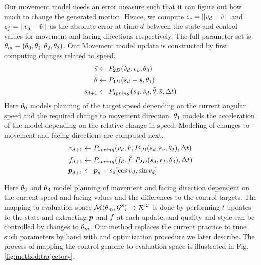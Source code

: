 Our movement model needs an error measure such that it can figure out how much to change the generated motion. Hence, we compute $\epsilon_v=||v_d-\hat{v}||$ and $\epsilon_f=||v_d-\hat{v}||$ as the absolute error at time $d$ between the state and control values for movement and facing directions respectively. 
%
The full parameter set is $\theta_{m}\equiv(\theta_0,\theta_1,\theta_2,\theta_3)$. 
%
Our Movement model update is constructed by first computing  changes related to speed. 
\begin{subequations}
\begin{align}
    \bar{s}&\leftarrow{}P_{2D}({\dot{v}}_d,\epsilon_v,\theta_0)\\
    \bar{\theta}&\leftarrow{}P_{1D}(s_d-\bar{s}, \theta_1)\\
    s_{d+1}&\leftarrow{}P_{spring}(s_d,\dot{s}_d,\bar{\theta},\bar{s},\Delta{t})
\end{align}
\end{subequations}
Here $\theta_0$  models planning of the target speed depending on the current angular speed and the required change to movement direction. $\theta_1$ models the acceleration of the model depending on the relative change in speed.
%
Modeling of changes to movement and facing directions are computed next.
\begin{subequations}
    \begin{align}
        v_{d+1}&\leftarrow P_{spring}(v_d,\hat{v},P_{2D}(s_{d},\epsilon_v, \theta_2),\Delta{t})\\ 
        f_{d+1}&\leftarrow P_{spring}(f_d,\hat{f},P_{2D}(s_{d},\epsilon_f, \theta_3),\Delta{t})\\
        \boldsymbol{p }_{d+1}&\leftarrow{}\boldsymbol{p }_d+s_{d}[\cos{v_d},\sin{v_d}]
    \end{align}
\end{subequations}

Here $\theta_2$ and $\theta_3$ model planning of movement and facing direction dependent on the current speed and facing values and the differences to the control targets.
%
The mapping to evaluation space $\mathcal{M}(\theta_{m}, \mathcal{G}^{8}) \rightarrow \mathcal{R}^{3t}$ is done by performing $t$ updates to the state and extracting $\boldsymbol{p }$ and $f$ at each update, and quality and style can be controlled by changes to $\theta_{m}$. Our method replaces the current practice to tune such parameters by hand with and optimization procedure we later describe. The process of mapping the control genome to evaluation space is illustrated in Fig. \ref{fig:method:trajectory}. 

